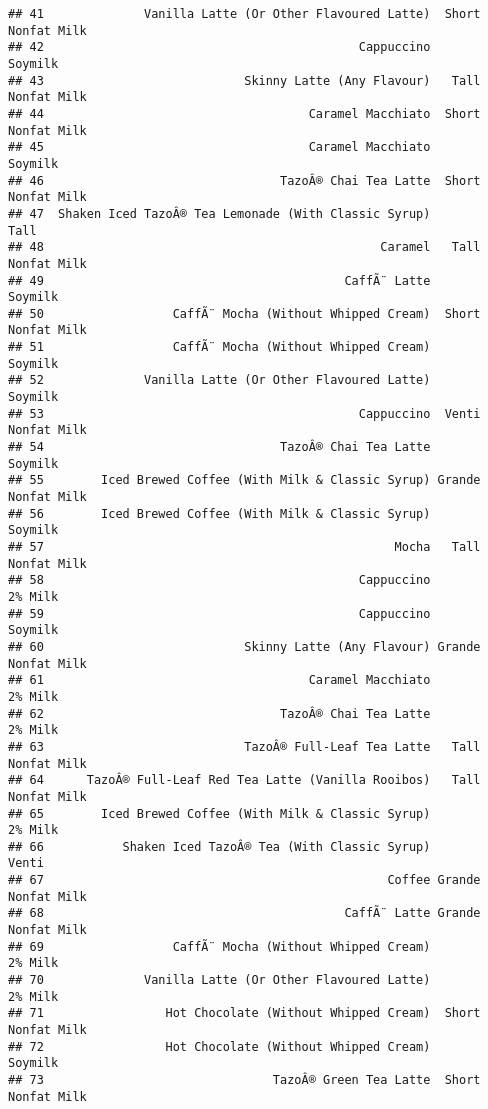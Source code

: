\documentclass[
]{article}
\begin{document}
\begin{verbatim}
## 41              Vanilla Latte (Or Other Flavoured Latte)  Short Nonfat Milk
## 42                                            Cappuccino            Soymilk
## 43                            Skinny Latte (Any Flavour)   Tall Nonfat Milk
## 44                                     Caramel Macchiato  Short Nonfat Milk
## 45                                     Caramel Macchiato            Soymilk
## 46                                 TazoÂ® Chai Tea Latte  Short Nonfat Milk
## 47  Shaken Iced TazoÂ® Tea Lemonade (With Classic Syrup)               Tall
## 48                                               Caramel   Tall Nonfat Milk
## 49                                          CaffÃ¨ Latte            Soymilk
## 50                  CaffÃ¨ Mocha (Without Whipped Cream)  Short Nonfat Milk
## 51                  CaffÃ¨ Mocha (Without Whipped Cream)            Soymilk
## 52              Vanilla Latte (Or Other Flavoured Latte)            Soymilk
## 53                                            Cappuccino  Venti Nonfat Milk
## 54                                 TazoÂ® Chai Tea Latte            Soymilk
## 55        Iced Brewed Coffee (With Milk & Classic Syrup) Grande Nonfat Milk
## 56        Iced Brewed Coffee (With Milk & Classic Syrup)            Soymilk
## 57                                                 Mocha   Tall Nonfat Milk
## 58                                            Cappuccino            2% Milk
## 59                                            Cappuccino            Soymilk
## 60                            Skinny Latte (Any Flavour) Grande Nonfat Milk
## 61                                     Caramel Macchiato            2% Milk
## 62                                 TazoÂ® Chai Tea Latte            2% Milk
## 63                            TazoÂ® Full-Leaf Tea Latte   Tall Nonfat Milk
## 64      TazoÂ® Full-Leaf Red Tea Latte (Vanilla Rooibos)   Tall Nonfat Milk
## 65        Iced Brewed Coffee (With Milk & Classic Syrup)            2% Milk
## 66           Shaken Iced TazoÂ® Tea (With Classic Syrup)              Venti
## 67                                                Coffee Grande Nonfat Milk
## 68                                          CaffÃ¨ Latte Grande Nonfat Milk
## 69                  CaffÃ¨ Mocha (Without Whipped Cream)            2% Milk
## 70              Vanilla Latte (Or Other Flavoured Latte)            2% Milk
## 71                 Hot Chocolate (Without Whipped Cream)  Short Nonfat Milk
## 72                 Hot Chocolate (Without Whipped Cream)            Soymilk
## 73                                TazoÂ® Green Tea Latte  Short Nonfat Milk

\end{verbatim}
\end{document}
